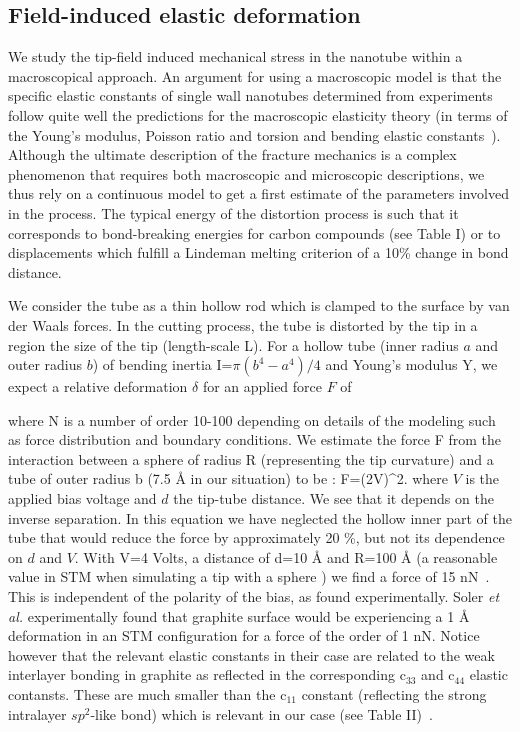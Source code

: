 \begin{multicols}{2}
\subsection{Field-induced elastic deformation}

We study the tip-field induced mechanical stress in the nanotube
within a macroscopical approach. An argument for using a
macroscopic model is that the specific elastic constants of single
wall nanotubes determined from experiments follow quite well the
predictions for the macroscopic elasticity theory (in terms of the
Young's modulus, Poisson ratio and torsion and bending elastic
constants~\cite{Hernandez}). Although the ultimate description of
the fracture mechanics is a complex phenomenon that requires both
macroscopic and microscopic descriptions, we thus rely on a
continuous model to get a first estimate of the parameters
involved in the process. The typical energy of the distortion
process is such that it corresponds to bond-breaking energies for
carbon compounds (see Table I) or to displacements which fulfill a
Lindeman melting criterion \cite{Lindemann} of a 10\% change in
bond distance.

We consider the tube as a thin hollow rod which is  clamped to the
surface by van der Waals forces. In the cutting process, the tube
is distorted by the tip in a region the size of the tip
(length-scale L). For a hollow tube (inner radius $a$ and outer
radius $b$) of bending inertia I=$\pi (b^{4}-a^{4})/4$ and Young's
modulus Y, we expect a relative deformation $\delta$ for an
applied force $F$ of \cite{LL}
%

\be
{}\approx {} \ee
%
where N is a number of order 10-100 depending on details of the
modeling such as force distribution and boundary conditions. We
estimate the force F from the interaction between a sphere of
radius R (representing the tip curvature) and a tube of outer
radius b (7.5 {\AA } in our situation) to be \cite{DJ}:
%
\be
F=(2\pi V)^{2}. \ee
%
where $V$ is the applied bias voltage and $d$ the tip-tube
distance. We see that it depends on the inverse separation. In
this equation we have neglected the hollow inner part of the tube
that would reduce the force by approximately 20 \%, but not its
dependence on $d$ and $V$.  With V=4 Volts, a distance of d=10
{\AA } and R=100 {\AA } (a reasonable value in STM  when
simulating a tip with a sphere \cite{Johansson}) we find a force
of 15 nN~\cite{linear}. This is independent of the polarity of the
bias, as found experimentally. Soler {\it et al.} \cite{soler}
experimentally found that graphite surface would be experiencing a
1 {\AA } deformation in an STM configuration for a force of the
order of 1 nN. Notice however that the relevant elastic constants
in their case are related to the weak interlayer bonding in
graphite as reflected in the corresponding c$_{33}$ and c$_{44}$
elastic contansts. These are much smaller than the c$_{11}$
constant (reflecting the strong intralayer $sp^2$-like bond) which
is relevant in our case (see Table II)~\cite{shear}.


\end{multicols}
